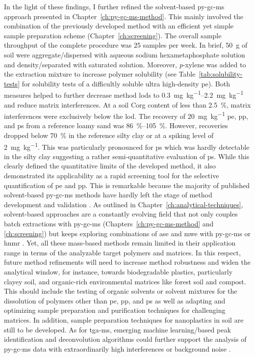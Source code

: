 In the light of these findings, I further refined the solvent-based \ac{py-gc-ms} approach presented in Chapter~\ref{ch:py-gc-ms-method}. This mainly involved the combination of the previously developed method with an efficient yet simple sample preparation scheme (Chapter~\ref{ch:screening}). The overall sample throughput of the complete procedure was \num{25} samples per week.
In brief, \SI{50}{\gram} of soil were aggregate\-/dispersed with aqueous sodium hexametaphosphate solution and density\-/separated with saturated  solution. Moreover, \textit{p}-xylene was added to the extraction mixture to increase polymer solubility (see Table~\ref{tab:solubility-tests} for solubility tests of a difficultly soluble ultra high-density \ac{pe}). Both measures helped to further decrease method \acp{lod} to \SIrange{0.3}{2.2}{\milli\gram\per\kilo\gram} and reduce matrix interferences. At a soil \ac{Corg} content of less than \SI{2.5}{\percent}, matrix interferences were exclusively below the \ac{lod}. The recovery of \SI{20}{\milli\gram\per\kilo\gram} \ac{pe}, \ac{pp}, and \ac{ps} from a reference loamy sand was \SIrange{86}{105}{\percent}. However, recoveries dropped below \SI{70}{\percent} in the reference silty clay or at a spiking level of \SI{2}{\milli\gram\per\kilo\gram}. This was particularly pronounced for \ac{ps} which was hardly detectable in the silty clay suggesting a rather semi-quantitative evaluation of \ac{ps}.
While this clearly defined the quantitative limits of the developed method, it also demonstrated its applicability as a rapid screening tool for the selective quantification of \ac{pe} and \ac{pp}. This is remarkable because the majority of published solvent-based \ac{py-gc-ms} methods have hardly left the stage of method development and validation \citep{DierkesQuantification2019,OkoffoIdentification2020}. As outlined in Chapter~\ref{ch:analytical-techniques}, solvent-based approaches are a constantly evolving field that not only couples batch extractions with \ac{py-gc-ms} (Chapters~\ref{ch:py-gc-ms-method} and \ref{ch:screening}) but keeps exploring combinations of \ac{ase} and \ac{mwe} with \ac{py-gc-ms} or \ac{hnmr} \citep{OkoffoIdentification2020,HermabessiereMicrowaveAssisted2021,NelsonQuantification2019,PeezQuantitative2020}.
Yet, all these mass-based methods remain limited in their application range in terms of the analyzable target polymers and matrices. In this respect, future method refinements will need to increase method robustness and widen the analytical window, for instance, towards biodegradable plastics, particularly clayey soil, and organic-rich environmental matrices like forest soil and compost. This should include the testing of organic solvents or solvent mixtures for the dissolution of polymers other than \ac{pe}, \ac{pp}, and \ac{ps} as well as adapting and optimizing sample preparation and purification techniques for challenging matrices. In addition, sample preparation techniques for nanoplastics in soil are still to be developed. As for \ac{tga-ms}, emerging machine learning\-/based peak identification and deconvolution algorithms could further support the analysis of \ac{py-gc-ms} data with extraordinarily high interferences or background noise \citep{CowgerCritical2020,MatsuiIdentification2020}.
